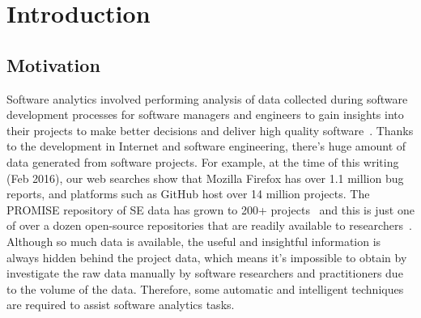 \section{Introduction}

\subsection{Motivation}

 Software analytics involved performing analysis of data collected during software development
 processes for software managers and engineers to gain insights into their projects
 to make better decisions and deliver high quality software~\cite{menzies2013software}.
 Thanks to the development in Internet and software engineering, there's huge amount
 of data generated from software projects. For example, at the time of this writing (Feb 2016),
 our web searches show that Mozilla Firefox has over 1.1 million bug reports, and
 platforms such as GitHub host over 14 million projects. The PROMISE repository
 of SE data has grown to 200+ projects~\cite{promise15} and this is just one of
 over a dozen open-source repositories that are readily available to researchers~\cite{rod12}.
 Although so much data is available, the useful and insightful information is always 
 hidden behind the project data, which means it's impossible to obtain by investigate the raw data manually by software researchers and practitioners due to the volume of the data. Therefore, some
 automatic and intelligent techniques are required to assist software analytics tasks.
 

